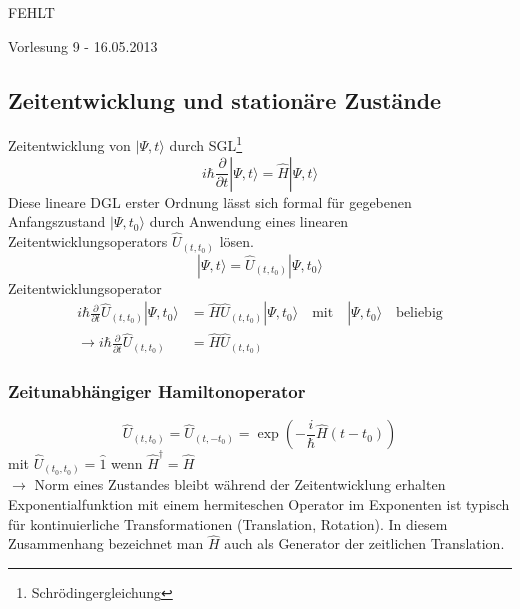 \documentclass[10pt,article,colorback,accentcolor=tud9d]{scrartcl}
\begin{document}
\textcolor[rgb]{1,0,0}{FEHLT}

\begin{flushright}
Vorlesung 9 - 16.05.2013
\end{flushright}

\subsection{Zeitentwicklung und stationäre Zustände}
Zeitentwicklung von $\left.\right|\Psi,t\rangle$ durch SGL\footnote{Schrödingergleichung} 
\begin{equation}
i\hbar \frac{\partial}{\partial t}\left.\right|\Psi,t\rangle=\hat{H}\left.\right|\Psi,t\rangle
\label{eq:Schrödingergleichung}
\end{equation}
Diese lineare DGL erster Ordnung lässt sich formal für gegebenen Anfangszustand $\left.\right|\Psi,t_0\rangle$ durch Anwendung eines linearen Zeitentwicklungsoperators $\hat{U}_{(t,t_0)}$ lösen.
\begin{equation}
\left.\right|\Psi,t\rangle=\hat{U}_{(t,t_0)}\left.\right|\Psi,t_0\rangle
\end{equation}
Zeitentwicklungsoperator
\begin{align}
i\hbar\frac{\partial}{\partial t}\hat{U}_{(t,t_0)}\left.\right|\Psi,t_0\rangle&=\hat{H}\hat{U}_{(t,t_0)}\left.\right|\Psi,t_0\rangle \quad \text{mit} \quad \left.\right|\Psi,t_0\rangle \quad \text{beliebig}\\
\rightarrow i\hbar \frac{\partial}{\partial t}\hat{U}_{(t,t_0)}&=\hat{H}\hat{U}_{(t,t_0)}
\end{align}
\subsubsection{Zeitunabhängiger Hamiltonoperator}
\begin{equation}
\hat{U}_{(t,t_0)}=\hat{U}_{(t,-t_0)}=\exp\left(-\frac{i}{\hbar}\hat{H}(t-t_0)\right)
\end{equation}
mit $\hat{U}_{(t_0,t_0)}=\hat{1}$ wenn $\hat{H}^\dagger=\hat{H}$\\
$\rightarrow$ Norm eines Zustandes bleibt während der Zeitentwicklung erhalten\\
Exponentialfunktion mit einem hermiteschen Operator im Exponenten ist typisch für kontinuierliche Transformationen (Translation, Rotation). In diesem Zusammenhang bezeichnet man $\hat{H}$ auch als Generator der zeitlichen Translation.\\
\end{document}
